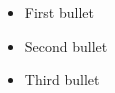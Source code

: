 \documentclass{article}
\begin{document}
\begin{itemize}
\item First bullet
\item Second bullet
\item Third bullet
\end{itemize}
\end{document}
